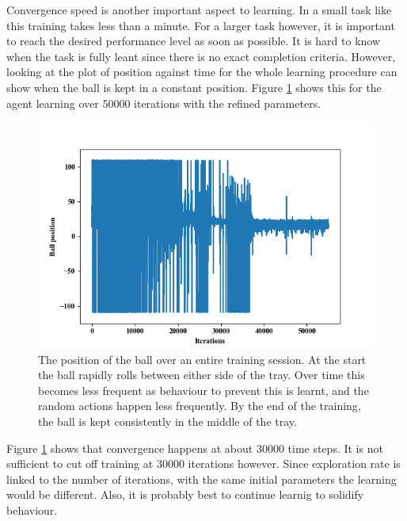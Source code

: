 \documentclass[12pt,a4paper]{article}
\begin{document}
Convergence speed is another important aspect to learning. In a small task like this training takes less than a minute. For a larger task however, it is important to reach the desired performance level as soon as possible. It is hard to know when the task is fully leant since there is no exact completion criteria. However, looking at the plot of position against time for the whole learning procedure can show when the ball is kept in a constant position. Figure \ref{f3} shows this for the agent learning over 50000 iterations with the refined parameters.
\begin{figure}[H]
	\includegraphics{153_small}
	\caption{The position of the ball over an entire training session. At the start the ball rapidly rolls between either side of the tray. Over time this becomes less frequent as behaviour to prevent this is learnt, and the random actions happen less frequently. By the end of the training, the ball is kept consistently in the middle of the tray.}
	\label{f3}
\end{figure}
Figure \ref{f3} shows that convergence happens at about 30000 time steps. It is not sufficient to cut off training at 30000 iterations however. Since exploration rate is linked to the number of iterations, with the same initial parameters the learning would be different. Also, it is probably best to continue learnig to solidify behaviour. 
\end{document}

